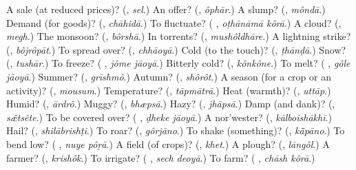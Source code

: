 \begin{tcolorbox}[breakable,colback=teal!4,colframe=teal!35!black,title={Before you move on}]
A sale (at reduced prices)? (\textbf{}, \emph{sel}.) An offer? (\textbf{}, \emph{ôphār}.) A slump? (\textbf{}, \emph{môndā}.) Demand (for goods)? (\textbf{}, \emph{chāhidā}.) To fluctuate? (\textbf{ }, \emph{oṭhānāmā kôrā}.) A cloud? (\textbf{}, \emph{megh}.) The monsoon? (\textbf{}, \emph{bôrshā}.) In torrents? (\textbf{}, \emph{mushôldhāre}.) A lightning strike? (\textbf{}, \emph{bôjrôpāt}.) To spread over? (\textbf{}, \emph{chhāoyā}.) Cold (to the touch)? (\textbf{}, \emph{ṭhānḍā}.) Snow? (\textbf{}, \emph{tushār}.) To freeze? (\textbf{ }, \emph{jôme jāoyā}.) Bitterly cold? (\textbf{}, \emph{kônkône}.) To melt? (\textbf{ }, \emph{gôle jāoyā}.) Summer? (\textbf{}, \emph{grīshmô}.) Autumn? (\textbf{}, \emph{shôrôt}.) A season (for a crop or an activity)? (\textbf{}, \emph{mousum}.) Temperature? (\textbf{}, \emph{tāpmātrā}.) Heat (warmth)? (\textbf{}, \emph{uttāp}.) Humid? (\textbf{}, \emph{ārdrô}.) Muggy? (\textbf{}, \emph{bhæpsā}.) Hazy? (\textbf{}, \emph{jhāpsā}.) Damp (and dank)? (\textbf{}, \emph{sæ̃tsẽte}.) To be covered over? (\textbf{ }, \emph{ḍheke jāoyā}.) A nor'wester? (\textbf{}, \emph{kālboishākhī}.) Hail? (\textbf{}, \emph{shilābrishṭi}.) To roar? (\textbf{}, \emph{gôrjāno}.) To shake (something)? (\textbf{}, \emph{kā̃pāno}.) To bend low? (\textbf{ }, \emph{nuye pôṛā}.) A field (of crops)? (\textbf{}, \emph{khet}.) A plough? (\textbf{}, \emph{lāngôl}.) A farmer? (\textbf{}, \emph{krishôk}.) To irrigate? (\textbf{ }, \emph{sech deoyā}.) To farm? (\textbf{ }, \emph{chāsh kôrā}.)
\end{tcolorbox}
